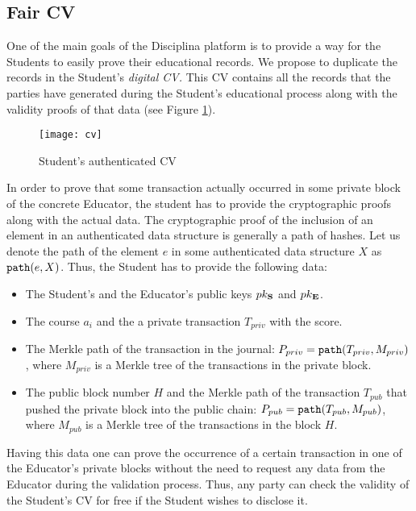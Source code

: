 \subsection{Fair CV}
One of the main goals of the Disciplina platform is to provide a way for the Students to easily prove their educational records. We propose to duplicate the records in the Student's \textit{digital CV.} This CV contains all the records that the parties have generated during the Student's educational process along with the validity proofs of that data (see Figure \ref{fig:cv}).

\begin{figure}[ht]
\centering
\texttt{[image: cv]}
\caption{Student's authenticated CV}
\label{fig:cv}
\end{figure}

In order to prove that some transaction actually occurred in some private block of the concrete Educator, the student has to provide the cryptographic proofs along with the actual data. The cryptographic proof of the inclusion of an element in an authenticated data structure is generally a path of hashes. Let us denote the path of the element $e$ in some authenticated data structure $X$ as $\mathtt{path}(e, X)$. Thus, the Student has to  provide the following data:
\begin{itemize}
  \item The Student's and the Educator's public keys $pk_{\mathbf{S}}$ and $pk_{\mathbf{E}}$.
  \item The course $a_i$ and the a private transaction $T_{priv}$ with the score.
  \item The Merkle path of the transaction in the journal: $P_{priv} = \mathtt{path}(T_{priv}, M_{priv})$, where $M_{priv}$ is a Merkle tree of the transactions in the private block.
  \item The public block number $H$ and the Merkle path of the transaction $T_{pub}$ that pushed the private block into the public chain: $P_{pub} = \mathtt{path}(T_{pub}, M_{pub})$, where $M_{pub}$ is a Merkle tree of the transactions in the block $H$.
\end{itemize}

Having this data one can prove the occurrence of a certain transaction in one of the Educator's private blocks without the need to request any data from the Educator during the validation process. Thus, any party can check the validity of the Student's CV for free if the Student wishes to disclose it.


